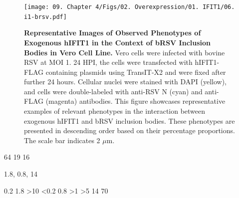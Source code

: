 \begin{figure}
    \centering
    \texttt{[image: 09. Chapter 4/Figs/02. Overexpression/01. IFIT1/06. i1-brsv.pdf]}
    \caption[Representative Images of Observed Phenotypes of Exogenous hIFIT1 in the Context of bRSV Inclusion Bodies in Vero Cell Line.]{\textbf{Representative Images of Observed Phenotypes of Exogenous hIFIT1 in the Context of bRSV Inclusion Bodies in Vero Cell Line.} Vero cells were infected with bovine RSV at MOI 1. 24 HPI, the cells were transfected with hIFIT1-FLAG containing plasmids using TransIT-X2 and were fixed after further 24 hours. Cellular nuclei were stained with DAPI (yellow), and cells were double-labeled with anti-RSV N (cyan) and anti-FLAG (magenta) antibodies. This figure showcases representative examples of relevant phenotypes in the interaction between exogenous hIFIT1 and bRSV inclusion bodies. These phenotypes are presented in descending order based on their percentage proportions. The scale bar indicates 2 \(\mu \mbox{m}\).}
    \label{fig:Representative Images of Observed Phenotypes of Exogenous hIFIT1 in the Context of bRSV Inclusion Bodies in VERO Cell Line}
\end{figure}

64 19 16

1.8, 0.8, 14

0.2 1.8 >10
<0.2 0.8 >1
>5 14 70

